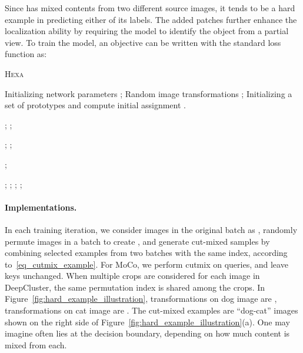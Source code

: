 \documentclass[10pt,twocolumn,letterpaper]{article}
\newcommand{\shortname}{\textsc{Hexa}}
\begin{document}
Since  has mixed contents from two different source images, it tends to be a hard example in predicting either of its labels. The added patches further enhance the localization ability by requiring the
model to identify the object from a partial view.
To train the model, an objective can be written with the standard loss function as:





\begin{algorithm}[!t]
   \caption{\shortname{} }
   \label{alg:sat_deepcluster}
\begin{algorithmic}[1]
    \Require Initializing network parameters ; Random image transformations ; Initializing a set of prototypes  and compute initial assignment .

        \State {\quad {\small \color{blue} }}    
        ;
        ;
        
        \State{\quad {\small \color{blue} }}  
        ;
        ;

        \State{\quad {\small \color{blue} }}  
        ;

        \State{\quad {\small \color{blue} }} 
        ;
        ;
   \EndFor        
        \State{\!\! {\small \color{blue} }} 
        ;          
        ;    
   \EndFor
\end{algorithmic}
\end{algorithm}
\vspace{-3mm}

\paragraph{Implementations.} In each training iteration, we consider images in the original batch as ,  randomly permute images in a batch to create , and generate cut-mixed samples by combining selected examples from two batches with the same index, according to~\eqref{eq_cutmix_example}. For MoCo, we perform cutmix on queries, and leave keys unchanged. When multiple crops are considered for each image in DeepCluster, the same permutation index is shared among the crops.  In Figure~\ref{fig:hard_example_illustration}, transformations on dog image are  ,  transformations on cat image are . The cut-mixed examples  are ``dog-cat'' images shown on the right side of Figure~\ref{fig:hard_example_illustration}(a). One may imagine  often lies at the decision boundary, depending on how much content is mixed from each.
\end{document}
